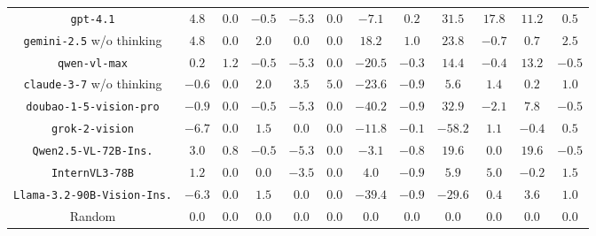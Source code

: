 \begin{table}[t]
\begin{tabular}{cccccccccccc}
\midrule
\texttt{gpt-4.1} & $4.8$ & \cellcolor{equal} $0.0$ & \cellcolor{below} $-0.5$ & \cellcolor{below} $-5.3$ & \cellcolor{equal} $0.0$ & \cellcolor{below} $-7.1$ & $0.2$ & $31.5$ & \cellcolor{second} $17.8$ & $11.2$ & $0.5$ \\
\texttt{gemini-2.5} w/o thinking & $4.8$ & \cellcolor{equal} $0.0$ & $2.0$ & \cellcolor{equal} $0.0$ & \cellcolor{equal} $0.0$ & $18.2$ & $1.0$ & $23.8$ & \cellcolor{below} $-0.7$ & $0.7$ & $2.5$ \\
\texttt{qwen-vl-max} & $0.2$ & $1.2$ & \cellcolor{below} $-0.5$ & \cellcolor{below} $-5.3$ & \cellcolor{equal} $0.0$ & \cellcolor{below} $-20.5$ & \cellcolor{below} $-0.3$ & $14.4$ & \cellcolor{below} $-0.4$ & $13.2$ & \cellcolor{below} $-0.5$ \\
\texttt{claude-3-7} w/o thinking & \cellcolor{below} $-0.6$ & \cellcolor{equal} $0.0$ & $2.0$ & $3.5$ & $5.0$ & \cellcolor{below} $-23.6$ & \cellcolor{below} $-0.9$ & $5.6$ & $1.4$ & $0.2$ & $1.0$ \\
\texttt{doubao-1-5-vision-pro} & \cellcolor{below} $-0.9$ & \cellcolor{equal} $0.0$ & \cellcolor{below} $-0.5$ & \cellcolor{below} $-5.3$ & \cellcolor{equal} $0.0$ & \cellcolor{below} $-40.2$ & \cellcolor{below} $-0.9$ & $32.9$ & \cellcolor{below} $-2.1$ & $7.8$ & \cellcolor{below} $-0.5$ \\
\texttt{grok-2-vision} & \cellcolor{below} $-6.7$ & \cellcolor{equal} $0.0$ & $1.5$ & \cellcolor{equal} $0.0$ & \cellcolor{equal} $0.0$ & \cellcolor{below} $-11.8$ & \cellcolor{below} $-0.1$ & \cellcolor{below} $-58.2$ & $1.1$ & \cellcolor{below} $-0.4$ & $0.5$ \\
\midrule
\texttt{Qwen2.5-VL-72B-Ins.} & $3.0$ & $0.8$ & \cellcolor{below} $-0.5$ & \cellcolor{below} $-5.3$ & \cellcolor{equal} $0.0$ & \cellcolor{below} $-3.1$ & \cellcolor{below} $-0.8$ & $19.6$ & \cellcolor{equal} $0.0$ & $19.6$ & \cellcolor{below} $-0.5$ \\
\texttt{InternVL3-78B} & $1.2$ & \cellcolor{equal} $0.0$ & \cellcolor{equal} $0.0$ & \cellcolor{below} $-3.5$ & \cellcolor{equal} $0.0$ & $4.0$ & \cellcolor{below} $-0.9$ & $5.9$ & \cellcolor{third} $5.0$ & \cellcolor{below} $-0.2$ & $1.5$ \\
\texttt{Llama-3.2-90B-Vision-Ins.} & \cellcolor{below} $-6.3$ & \cellcolor{equal} $0.0$ & $1.5$ & \cellcolor{equal} $0.0$ & \cellcolor{equal} $0.0$ & \cellcolor{below} $-39.4$ & \cellcolor{below} $-0.9$ & \cellcolor{below} $-29.6$ & $0.4$ & $3.6$ & $1.0$ \\
\midrule
Random & $0.0$ & $0.0$ & $0.0$ & $0.0$ & $0.0$ & $0.0$ & $0.0$ & $0.0$ & $0.0$ & $0.0$ & $0.0$ \\
\bottomrule
\end{tabular}
\end{table}
